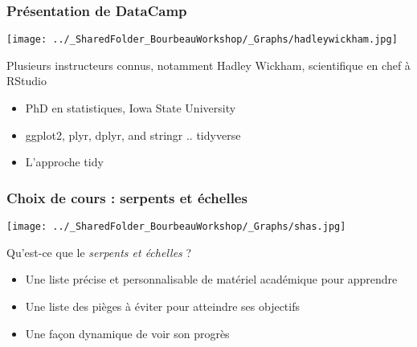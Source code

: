 \documentclass{beamer}
\begin{document}

    \begin{frame}
    
      \frametitle{Présentation de DataCamp} \vspace{1cm}
      
        \begin{center}
        
         \texttt{[image: ../\_SharedFolder\_BourbeauWorkshop/\_Graphs/hadleywickham.jpg]}
         
        \end{center} 
      
      Plusieurs instructeurs connus, notamment Hadley Wickham, scientifique en chef à RStudio
      
          \begin{itemize}
            \item{PhD en statistiques, Iowa State University}
            \item{ggplot2, plyr, dplyr, and stringr .. tidyverse}
            \item{L'approche tidy}
          \end{itemize}
    
    \end{frame}
    

   \begin{frame}
    
      \frametitle{Choix de cours : serpents et échelles} \vspace{1cm}
      
      
        \begin{center}
        
          \texttt{[image: ../\_SharedFolder\_BourbeauWorkshop/\_Graphs/shas.jpg]}
         
        \end{center} 
      
    Qu'est-ce que le \textit{serpents et échelles} ?

        \begin{itemize}
          \item{Une liste précise et personnalisable de matériel académique pour apprendre \R}
          \item{Une liste des pièges à éviter pour atteindre ses objectifs}
          \item{Une façon dynamique de voir son progrès}
        \end{itemize}

    \end{frame}
\end{document}
